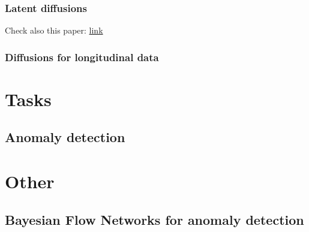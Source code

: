 \documentclass{article}
\begin{document}
\subsubsection{Latent diffusions}

Check also this paper: \href{https://arxiv.org/pdf/2504.05662}{link}

\subsubsection{Diffusions for longitudinal data}


\section{Tasks}

\subsection{Anomaly detection}







\section{Other}

\subsection{Bayesian Flow Networks for anomaly detection}

\cite{Graves}






\end{document}
